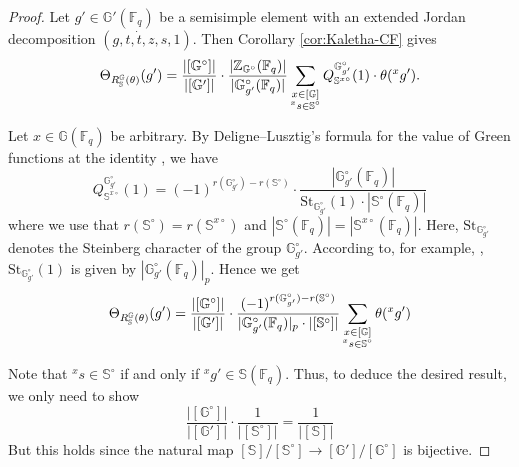\documentclass{amsart}
\newcommand{\F}{\mathbb{F}}
\newcommand{\FF}{\mathbb{F}}
\newcommand{\bbS}{\mathbb{S}}
\newcommand{\bbG}{\mathbb{G}}
\newcommand{\bbZ}{\mathbb{Z}}
\theoremstyle{plain}
\theoremstyle{definition}
\theoremstyle{remark}
\theoremstyle{theorem}
\begin{document}
\begin{proof}
Let $g' \in \bbG'(\FF_q)$ be a semisimple element with an extended Jordan decomposition $(g,t,\dot{t},z,s,1)$.
Then Corollary \ref{cor:Kaletha-CF} gives
\[
\Theta_{R_{\bbS}^{\bbG}(\theta)}(g')
=
\frac{|[\bbG^{\circ}]|}{|[\bbG']|}
\cdot\frac{|\bbZ_{\bbG^{\circ}}(\F_{q})|}{|\bbG^{\circ}_{g'}(\F_{q})|}
\sum_{\begin{subarray}{c}x\in [\bbG] \\ {}^{x}s\in\bbS^{\circ}\end{subarray}}
Q^{\bbG^{\circ}_{g'}}_{\bbS^{x\circ}}(1)\cdot \theta({}^{x}g').
\]

    Let $x \in \bbG(\FF_q)$ be arbitrary. By Deligne--Lusztig's formula for the value of Green functions at the identity \cite[Theorem 7.1]{DL76}, we have
    \begin{equation*}
        Q_{\bbS^{x \circ}}^{\bbG_{g'}^\circ}(1) = (-1)^{r(\bbG_{g'}^\circ) - r(\bbS^{\circ})} \cdot \frac{|\bbG_{g'}^\circ(\FF_q)|}{\mathrm{St}_{\bbG_{g'}^{\circ}}(1)\cdot |\bbS^{\circ}(\FF_q)|}
    \end{equation*}
    where we use that $r(\bbS^{\circ}) = r(\bbS^{x\circ})$ and $|\bbS^\circ(\FF_q)| = |\bbS^{x \circ}(\FF_q)|$.
Here, $\mathrm{St}_{\bbG_{g'}^{\circ}}$ denotes the Steinberg character of the group $\bbG_{g'}^{\circ}$.
According to, for example, \cite[Proposition 6.4.4]{Car85}, $\mathrm{St}_{\bbG_{g'}^{\circ}}(1)$ is given by $|\bbG_{g'}^\circ(\FF_q)|_p$.
Hence we get
\[
\Theta_{R_{\bbS}^{\bbG}(\theta)}(g')
=
\frac{|[\bbG^{\circ}]|}{|[\bbG']|}
\cdot\frac{(-1)^{r(\bbG_{g'}^\circ) - r(\bbS^{\circ})}}{|\bbG_{g'}^\circ(\FF_q)|_p\cdot |[\bbS^{\circ}]|}
\sum_{\begin{subarray}{c}x\in [\bbG] \\ {}^{x}s\in\bbS^{\circ}\end{subarray}}
\theta({}^{x}g')
\]

Note that ${}^{x}s\in\bbS^{\circ}$ if and only if ${}^{x}g'\in\bbS(\F_{q})$.
Thus, to deduce the desired result, we only need to show
    \begin{equation*}
        \frac{|[\bbG^\circ]|}{|[\bbG']|} \cdot \frac{1}{|[\bbS^\circ]|} = \frac{1}{|[\bbS]|}
    \end{equation*}
But this holds since the natural map $[\bbS]/[\bbS^\circ] \to [\bbG']/[\bbG^\circ]$ is bijective.
\end{proof}
\end{document}
